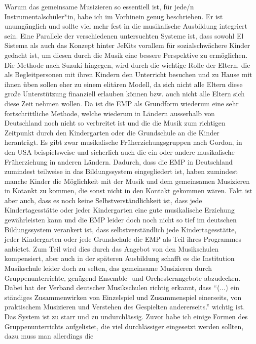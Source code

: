 Warum das gemeinsame Musizieren so essentiell ist, für jede/n
Instrumentalschüler*in, habe ich im Vorhinein genug beschrieben. Er ist
unumgänglich und sollte viel mehr fest in die musikalische Ausbildung integriert
sein. Eine Parallele der verschiedenen untersuchten Systeme ist, dass sowohl El
Sistema als auch das Konzept hinter JeKits vorallem für sozialschwächere Kinder
gedacht ist, um diesen durch die Musik eine bessere Perspektive zu ermöglichen.
Die Methode nach Suzuki hingegen, wird durch die wichtige Rolle der Eltern, die
als Begleitpersonen mit ihren Kindern den Unterricht besuchen und zu Hause mit
ihnen üben sollen eher zu einem elitären Modell, da sich nicht alle Eltern diese
große Unterstützung finanziell erlauben können bzw. auch nicht alle Eltern sich
diese Zeit nehmen wollen. Da ist die EMP als Grundform wiederum eine sehr
fortschrittliche Methode, welche wiederum in Ländern ausserhalb von Deutschland
noch nicht so verbreitet ist und die die Musik zum richtigen Zeitpunkt durch den
Kindergarten oder die Grundschule an die Kinder heranträgt. Es gibt zwar
musikalische Früherziehungsgruppen nach Gordon, in den USA beispielsweise und
sicherlich auch die ein oder andere musikalische Früherziehung in anderen
Ländern. Dadurch, dass die EMP in Deutschland zumindest teilweise in das
Bildungssystem eingegliedert ist, haben zumindest manche Kinder die Möglichkeit
mit der Musik und dem gemeinsamen Musizieren in Kotankt zu kommen, die sonst
nicht in den Kontakt gekommen wären. Fakt ist aber auch, dass es noch keine
Selbstverständlichkeit ist, dass jede Kindertagesstätte oder jeder Kindergarten
eine gute musikalische Erziehung gewährleisten kann und die EMP leider doch noch
nicht so tief im deutschen Bildungssystem verankert ist, dass selbstverständlich
jede Kindertagesstätte, jeder Kindergarten oder jede Grundschule die EMP als
Teil ihres Programmes anbietet. Zum Teil wird dies durch das Angebot von den
Musikschulen kompensiert, aber auch in der späteren Ausbildung schafft es die
Institution Musikschule leider doch zu selten, das gemeinsame Musizieren durch
Gruppenunterrichte, genügend Ensemble- und Orchesterangebote abzudecken. Dabei
hat der Verband deutscher Musikschulen richtig erkannt, dass \enquote{(...) ein
ständiges Zusammenwirken von Einzelspiel und Zusammenspiel einerseits, von
praktischem Musizieren und Verstehen des Gespielten andererseits.} wichtig ist.
\autocite[22]{losert:die_kunst_zu_unterrichten} Das System ist zu starr und zu
undurchlässig. Zuvor habe ich einige Formen des Gruppenunterrichts aufgelistet,
die viel durchlässiger eingesetzt werden sollten, dazu muss man allerdings die
